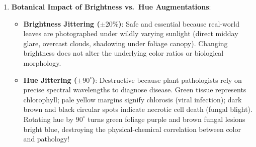\begin{enumerate}
\begin{enumerate}
        \item \textbf{Softmax Normalization}:
        First, compute exponentials:
        \begin{align*}
        e^{\hat{y}_0} &= e^{1.2} \approx 3.32012 \\
        e^{\hat{y}_1} &= e^{0.3} \approx 1.34986
        \end{align*}
        Sum: $3.32012 + 1.34986 = 4.66998$.
        Compute probabilities:
        \begin{align*}
        \hat{p}_0 &= \frac{3.32012}{4.66998} \approx \mathbf{0.71095} \quad (71.10\% \text{ Diseased}) \\
        \hat{p}_1 &= \frac{1.34986}{4.66998} \approx \mathbf{0.28905} \quad (28.90\% \text{ Healthy})
        \end{align*}

        \item \textbf{Categorical Cross-Entropy Loss}:
        The true label is Diseased ($y_0 = 1, y_1 = 0$):
        \begin{equation*}
        \mathcal{L} = -\ln(\hat{p}_0) = -\ln(0.71095) \approx \mathbf{0.34115}
        \end{equation*}
    \end{enumerate}

    \item \textbf{Botanical Impact of Brightness vs.\ Hue Augmentations}:
    \begin{itemize}
        \item \textbf{Brightness Jittering ($\pm 20\%$)}: Safe and essential because real-world leaves are photographed under wildly varying sunlight (direct midday glare, overcast clouds, shadowing under foliage canopy). Changing brightness does not alter the underlying color ratios or biological morphology.
        \item \textbf{Hue Jittering ($\pm 90^\circ$)}: Destructive because plant pathologists rely on precise spectral wavelengths to diagnose disease. Green tissue represents chlorophyll; pale yellow margins signify chlorosis (viral infection); dark brown and black circular spots indicate necrotic cell death (fungal blight). Rotating hue by $90^\circ$ turns green foliage purple and brown fungal lesions bright blue, destroying the physical-chemical correlation between color and pathology!
    \end{itemize}


\end{enumerate}
